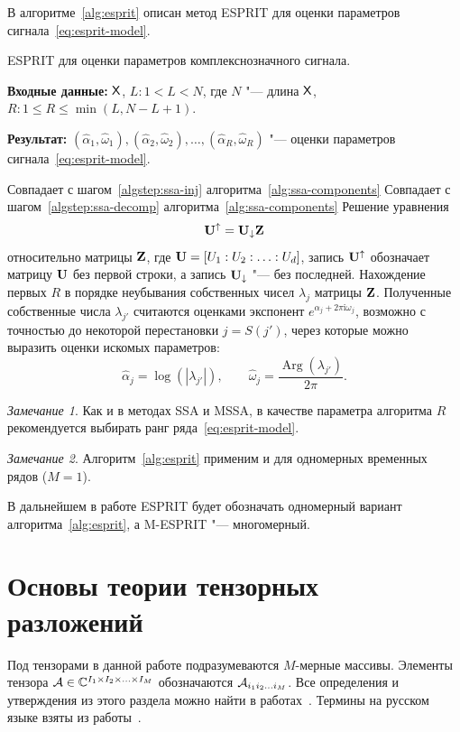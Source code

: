 \documentclass[specialist,
  substylefile=spbu_report.rtx,
subf,href,colorlinks=true, 12pt]{disser}
\theoremstyle{plain}
\theoremstyle{definition}
\theoremstyle{remark}
\newtheorem{remark}{Замечание}[section]
\newcommand{\Input}{\textbf{Входные данные: }}
\newcommand{\Output}{\textbf{Результат: }}
\newcommand{\iu}{\mathrm{i}}
\begin{document}
В алгоритме~\ref{alg:esprit} описан метод ESPRIT для оценки параметров
сигнала~\eqref{eq:esprit-model}.
\begin{algorithm}[!ht]
  \caption{ESPRIT для оценки параметров комплекснозначного сигнала.}
  \label{alg:esprit}
  \Input $\mathsf{X}$, $L: 1 < L < N$, где $N$ "--- длина $\mathsf{X}$, $R: 1
  \leqslant R\leqslant \min(L, N-L+1)$.

  \Output $\left(\widehat{\alpha}_1, \widehat{\omega}_1\right),
  \left(\widehat{\alpha}_2, \widehat{\omega}_2\right), \ldots,
  \left(\widehat{\alpha}_R, \widehat{\omega}_R\right)$ "--- оценки параметров
  сигнала~\eqref{eq:esprit-model}.
  \begin{algorithmic}[1]
    \State Совпадает с шагом~\ref{algstep:ssa-inj}
    алгоритма~\ref{alg:ssa-components}
    \State Совпадает с шагом~\ref{algstep:ssa-decomp}
    алгоритма~\ref{alg:ssa-components}
    \State Решение уравнения
    \[
      \mathbf{U}^{\uparrow}=\mathbf{U}_{\downarrow}\mathbf{Z}
    \]
    относительно матрицы $\mathbf{Z}$, где $\mathbf{U} = [U_1:U_2:\ldots: U_d]$,
    запись $\mathbf{U}^{\uparrow}$ обозначает матрицу $\mathbf{U}$ без первой строки, а
    запись $\mathbf{U}_{\downarrow}$ "--- без последней.
    \State Нахождение первых $R$ в порядке неубывания собственных
    чисел $\lambda_j$ матрицы $\mathbf{Z}$.
    Полученные собственные числа $\lambda_{j'}$ считаются оценками
    экспонент $e^{\alpha_j + 2\pi\iu \omega_j}$, возможно с точностью
    до некоторой перестановки
    $j = S (j')$, через которые можно выразить
    оценки искомых параметров:
    \[
      \widehat{\alpha}_j = \log\left(\left|\lambda_{j'}\right|\right), \qquad
      \widehat{\omega}_j =
      \frac{\operatorname{Arg}\left(\lambda_{j'}\right)}{2 \pi}.
    \]
  \end{algorithmic}
\end{algorithm}
\begin{remark}
  Как и в методах SSA и MSSA, в качестве параметра алгоритма $R$
  рекомендуется выбирать ранг
  ряда~\eqref{eq:esprit-model}.
\end{remark}
\begin{remark}
  Алгоритм~\ref{alg:esprit} применим и для одномерных временных рядов ($M=1$).
\end{remark}

В дальнейшем в работе ESPRIT будет обозначать одномерный вариант
алгоритма~\ref{alg:esprit}, а M-ESPRIT "--- многомерный.

\section{Основы теории тензорных разложений}\label{sec:tensor-decompositions}
Под тензорами в данной работе подразумеваются $M$-мерные массивы.
Элементы тензора $\mathcal{A} \in \mathbb{C}^{I_1 \times I_2 \times \ldots \times
I_M}$ обозначаются
$\mathcal{A}_{i_1 i_2 \ldots i_M}$.
Все определения и утверждения из этого раздела можно найти в
работах~\cite{Kilmer2011, hosvd, tensor-bg, tensor-bg2, tensor-bg3,Kilmer2013}.
Термины на русском языке взяты из работы~\cite{tensor-rus}.
\end{document}
